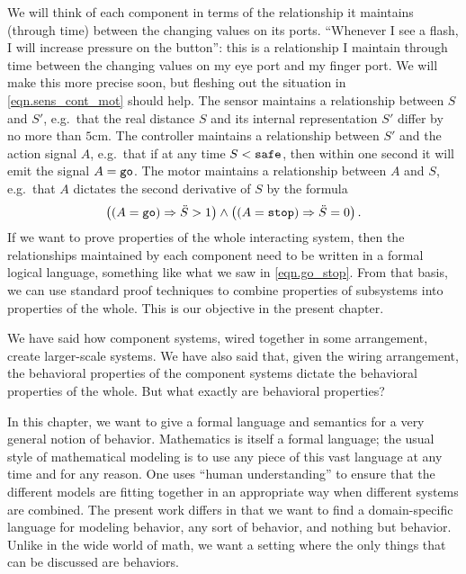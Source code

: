 \documentclass[7Sketches]{subfiles}
\begin{document}
We will think of each component in terms of the relationship it maintains (through time) between the changing values on its ports. ``Whenever I see a flash, I will increase pressure on the button'': this is a relationship I maintain through time between the changing values on my eye port and my finger port. We will make this more precise soon, but fleshing out the situation in \cref{eqn.sens_cont_mot} should help. The sensor maintains a relationship between $S$ and $S'$, e.g.\ that the real distance $S$ and its internal representation $S'$ differ by no more than $5\mathrm{cm}$. The controller maintains a relationship between $S'$ and the action signal $A$, e.g.\ that if at any time $S<\mathtt{safe}$, then within one second it will emit the signal $A=\mathtt{go}$. The motor maintains a relationship between $A$ and $S$, e.g.\ that $A$ dictates the second derivative of $S$ by the formula 
\begin{equation}%
\label{eqn.go_stop}
  \left((A=\const{go})\imp\ddot{S}>1\right)\wedge\left((A=\const{stop})\imp\ddot{S}=0\right).
\end{equation}
If we want to prove properties of the whole interacting system, then the relationships maintained by each component need to be written in a formal logical language, something like what we saw in \cref{eqn.go_stop}. From that basis, we can use standard proof techniques to combine properties of subsystems into properties of the whole. This is our objective in the present chapter.%

We have said how component systems, wired together in some arrangement, create larger-scale systems. We have also said that, given the wiring arrangement, the behavioral properties of the component systems dictate the behavioral properties of the whole. But what exactly are behavioral properties?

In this chapter, we want to give a formal language and semantics for a very
general notion of behavior. Mathematics is itself a formal language; the usual
style of mathematical modeling is to use any piece of this vast language at any
time and for any reason. One uses ``human understanding'' to ensure that the
different models are fitting together in an appropriate way when
different systems are combined.%
The present work differs in that we want to find a
domain-specific language for modeling behavior, any sort of behavior, and
nothing but behavior. Unlike in the wide world of math, we want a setting where
the only things that can be discussed are behaviors.
\end{document}
